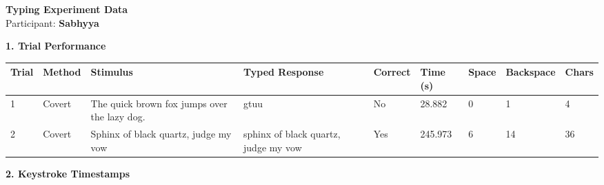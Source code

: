 \documentclass[10pt,a4paper]{article}
\begin{document}

\begin{center}
    {\Large\bfseries Typing Experiment Data}\\
    \vspace{2pt}
    Participant: \textbf{Sabhyya}
\end{center}

\vspace{0.25cm}


\noindent
{\large\bfseries 1. Trial Performance}

\vspace{0.08cm}

\begin{center}
\begin{tabularx}{\textwidth}{
    C{0.45in}
    C{0.65in}
    L{2.35in}
    L{2.55in}
    C{0.65in}
    C{0.65in}
    C{0.55in}
    C{0.75in}
    C{0.55in}
}
\toprule

\textbf{Trial} &
\textbf{Method} &
\textbf{Stimulus} &
\textbf{Typed Response} &
\textbf{Correct} &
\textbf{Time (s)} &
\textbf{Space} &
\textbf{Backspace} &
\textbf{Chars}
\\

\midrule

1 &
Covert &
The quick brown fox jumps over the lazy dog. &
gtuu &
No &
28.882 &
0 &
1 &
4
\\

2 &
Covert &
Sphinx of black quartz, judge my vow &
sphinx of black quartz, judge my vow &
Yes &
245.973 &
6 &
14 &
36
\\

\bottomrule
\end{tabularx}
\end{center}

\vspace{0.35cm}


\noindent
{\large\bfseries 2. Keystroke Timestamps}

\vspace{0.08cm}
\end{document}
